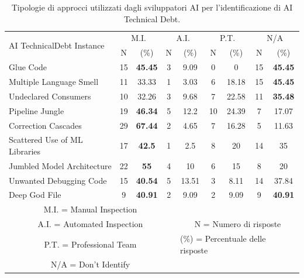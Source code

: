 \begin{table}[h!]
    \footnotesize
    \centering
    \begin{tabular}{|l|c|c|c|c|c|c|c|c|}
    \hline
    \multirow{2}{*}{AI TechnicalDebt Instance} & \multicolumn{2}{|c|}{M.I.} & \multicolumn{2}{c|}{A.I.} & \multicolumn{2}{c|}{P.T.} & \multicolumn{2}{c|}{N/A} \\
    \cline{2-9}
     & N & (\%) & N & (\%) & N & (\%) & N & (\%)\\
     
     
     \hline
Glue Code & 15 & \textbf{45.45} & 3 & 9.09 & 0 & 0 & 15 & \textbf{45.45} \\
Multiple Language Smell & 11 & 33.33 & 1 & 3.03 & 6 & 18.18 & 15 & \textbf{45.45} \\
Undeclared Consumers & 10 & 32.26 & 3 & 9.68 & 7 & 22.58 & 11 & \textbf{35.48} \\
Pipeline Jungle & 19 & \textbf{46.34} & 5 & 12.2 & 10 & 24.39 & 7 & 17.07 \\
Correction Cascades & 29 & \textbf{67.44} & 2 & 4.65 & 7 & 16.28 & 5 & 11.63 \\
Scattered Use of ML Libraries & 17 & \textbf{42.5} & 1 & 2.5 & 8 & 20 & 14 & 35 \\
Jumbled Model Architecture & 22 & \textbf{55} & 4 & 10 & 6 & 15 & 8 & 20 \\
Unwanted Debugging Code & 15 & \textbf{40.54} & 5 & 13.51 & 3 & 8.11 & 14 & 37.84 \\
Deep God File & 9 & \textbf{40.91} & 2 & 9.09 & 2 & 9.09 & 9 & \textbf{40.91} \\
    \hline
    \multicolumn{4}{|c|}{M.I. = Manual Inspection} & \multicolumn{5}{c|}{}\\ 
    \multicolumn{4}{|c|}{A.I. = Automated Inspection} & \multicolumn{5}{c|}{N = Numero di risposte} \\
    \multicolumn{4}{|c|}{P.T. = Professional Team} & \multicolumn{5}{l|}{(\%) = Percentuale delle risposte} \\
    \multicolumn{4}{|c|}{N/A = Don't Identify} & \multicolumn{5}{c|}{} \\
    \hline
    \end{tabular}
    \caption{Tipologie di approcci utilizzati dagli sviluppatori AI per l'identificazione di AI Technical Debt.}
    \label{tab:id_techniques}
\end{table}


